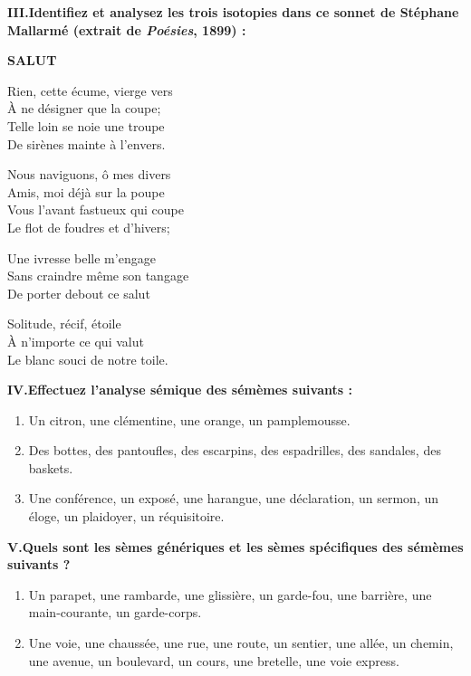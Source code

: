 \noindent\textbf{III.\quad Identifiez et analysez les trois isotopies dans ce sonnet de Stéphane Mallarmé (extrait de \textit{Poésies}, 1899) :}
\begin{center}
\textbf{SALUT}\par\medskip
Rien, cette écume, vierge vers\\
À ne désigner que la coupe;\\
Telle loin se noie une troupe\\
De sirènes mainte à l’envers.\par\medskip
Nous naviguons, ô mes divers\\
Amis, moi déjà sur la poupe\\
Vous l’avant fastueux qui coupe\\
Le flot de foudres et d’hivers;\par\medskip
Une ivresse belle m’engage\\
Sans craindre même son tangage\\
De porter debout ce salut\par\medskip
Solitude, récif, étoile\\
À n’importe ce qui valut\\
Le blanc souci de notre toile.
\end{center}

\noindent\textbf{IV.\quad Effectuez l’analyse sémique des sémèmes suivants :}
\begin{keybox}
\begin{enumerate}[label=\arabic*.]
\item Un citron, une clémentine, une orange, un pamplemousse.
\item Des bottes, des pantoufles, des escarpins, des espadrilles, des sandales, des baskets.
\item Une conférence, un exposé, une harangue, une déclaration, un sermon, un éloge, un plaidoyer, un réquisitoire.
\end{enumerate}
\end{keybox}

\noindent\textbf{V.\quad Quels sont les sèmes génériques et les sèmes spécifiques des sémèmes suivants ?}
\begin{keybox}
\begin{enumerate}[label=\arabic*.]
\item Un parapet, une rambarde, une glissière, un garde-fou, une barrière, une main-courante, un garde-corps.
\item Une voie, une chaussée, une rue, une route, un sentier, une allée, un chemin, une avenue, un boulevard, un cours, une bretelle, une voie express.
\end{enumerate}
\end{keybox}

